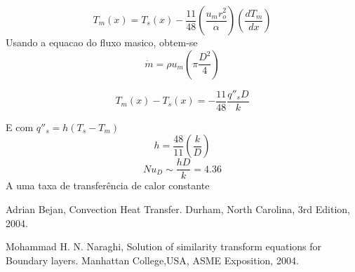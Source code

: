 \documentclass[12pt]{article}
\begin{document}
\begin{equation}
	T_m(x) = T_s(x) - \frac{11}{48} \left( \frac{u_m r_o^2}{\alpha} \right) \left( \frac{d T_m}{d x} \right)
\end{equation}
 Usando a equacao do fluxo masico, obtem-se
 \begin{equation}
 	\dot{m} = \rho u_m \left( \pi \frac{D^2}{4} \right)
 \end{equation}
 
 \begin{equation}
 	T_m(x) - T_s(x) = - \frac{11}{48} \frac{q''_s D}{k}
 \end{equation}
 
E com $q''_s = h (T_s - T_m)$
\begin{equation}
	h = \frac{48}{11} \left( \frac{k}{D} \right)
\end{equation}
\begin{equation}
	Nu_D \sim \frac{hD}{k} = 4.36
\end{equation}
A uma taxa de transferência de calor constante

\begin{thebibliography}{999}
	
	Adrian Bejan,
	Convection Heat Transfer.
	Durham, North Carolina,
	3rd Edition,
	2004.
	
	Mohammad H. N. Naraghi,
	Solution of similarity transform equations for Boundary layers.
	Manhattan College,USA,
	ASME Exposition,
	2004.
	
\end{thebibliography}
\end{document}
